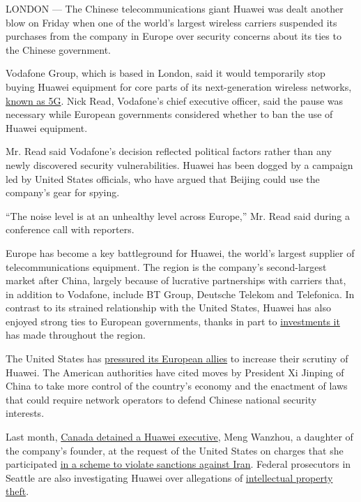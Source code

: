 LONDON --- The Chinese telecommunications giant Huawei was dealt another
blow on Friday when one of the world's largest wireless carriers
suspended its purchases from the company in Europe over security
concerns about its ties to the Chinese government.

Vodafone Group, which is based in London, said it would temporarily stop
buying Huawei equipment for core parts of its next-generation wireless
networks,
\href{https://www.nytimes.com/2018/12/31/technology/personaltech/5g-what-you-need-to-know.html?module=inline}{known
as 5G}. Nick Read, Vodafone's chief executive officer, said the pause
was necessary while European governments considered whether to ban the
use of Huawei equipment.

Mr. Read said Vodafone's decision reflected political factors rather
than any newly discovered security vulnerabilities. Huawei has been
dogged by a campaign led by United States officials, who have argued
that Beijing could use the company's gear for spying.

``The noise level is at an unhealthy level across Europe,'' Mr. Read
said during a conference call with reporters.

Europe has become a key battleground for Huawei, the world's largest
supplier of telecommunications equipment. The region is the company's
second-largest market after China, largely because of lucrative
partnerships with carriers that, in addition to Vodafone, include BT
Group, Deutsche Telekom and Telefonica. In contrast to its strained
relationship with the United States, Huawei has also enjoyed strong ties
to European governments, thanks in part to
\href{https://www.nytimes.com/2019/01/22/technology/huawei-europe-china.html}{investments
it} has made throughout the region.

The United States has
\href{https://www.nytimes.com/2018/12/06/technology/huawei-arrest-meng-wanzhou.html}{pressured
its European allies} to increase their scrutiny of Huawei. The American
authorities have cited moves by President Xi Jinping of China to take
more control of the country's economy and the enactment of laws that
could require network operators to defend Chinese national security
interests.

Last month,
\href{https://www.nytimes.com/2018/12/05/business/huawei-cfo-arrest-canada-extradition.html}{Canada
detained a Huawei executive}, Meng Wanzhou, a daughter of the company's
founder, at the request of the United States on charges that she
participated
\href{https://www.nytimes.com/2018/12/07/technology/huawei-meng-wanzhou-fraud.html}{in
a scheme to violate sanctions against Iran}. Federal prosecutors in
Seattle are also investigating Huawei over allegations of
\href{https://www.nytimes.com/2019/01/16/technology/huawei-investigation-trade-secrets.html?rref=collection\%2Fbyline\%2Fraymond-zhong\&action=click\&contentCollection=undefined\&region=stream\&module=inline\&version=latest\&contentPlacement=1\&pgtype=collection}{intellectual
property theft}.

